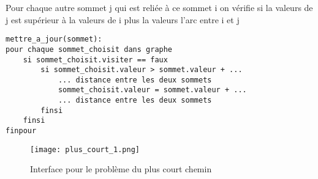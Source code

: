 				Pour chaque autre sommet j qui est reliée à ce sommet i on vérifie si
				la valeurs de j est supérieur à la valeurs de i plus la valeurs l'arc entre i et j

			\begin{lstlisting}
mettre_a_jour(sommet):
pour chaque sommet_choisit dans graphe
    si sommet_choisit.visiter == faux
        si sommet_choisit.valeur > sommet.valeur + ...
            ... distance entre les deux sommets
		    sommet_choisit.valeur = sommet.valeur + ...
            ... distance entre les deux sommets
        finsi
	finsi
finpour
			\end{lstlisting}

\begin{figure}[H]
\begin{center}
    \texttt{[image: plus\_court\_1.png]} %
    \caption{Interface pour le problème du plus court chemin}
\end{center}
\end{figure}

